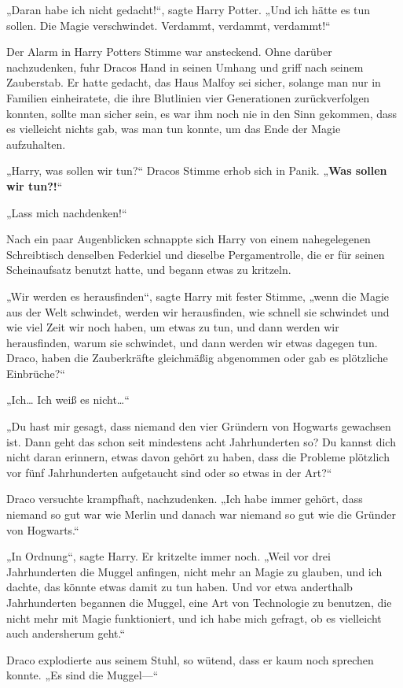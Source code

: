 {„Daran habe ich nicht gedacht!“, sagte Harry Potter. „Und ich hätte es tun sollen. Die Magie verschwindet. Verdammt, verdammt, verdammt!“

Der Alarm in Harry Potters Stimme war ansteckend. Ohne darüber nachzudenken, fuhr Dracos Hand in seinen Umhang und griff nach seinem Zauberstab. Er hatte gedacht, das Haus Malfoy sei sicher, solange man nur in Familien einheiratete, die ihre Blutlinien vier Generationen zurückverfolgen konnten, sollte man sicher sein, es war ihm noch nie in den Sinn gekommen, dass es vielleicht nichts gab, was man tun konnte, um das Ende der Magie aufzuhalten.

„Harry, was sollen wir tun?“ Dracos Stimme erhob sich in Panik. „\textbf{Was sollen wir tun?!}“

„Lass mich nachdenken!“

Nach ein paar Augenblicken schnappte sich Harry von einem nahegelegenen Schreibtisch denselben Federkiel und dieselbe Pergamentrolle, die er für seinen Scheinaufsatz benutzt hatte, und begann etwas zu kritzeln.

„Wir werden es herausfinden“, sagte Harry mit fester Stimme, „wenn die Magie aus der Welt schwindet, werden wir herausfinden, wie schnell sie schwindet und wie viel Zeit wir noch haben, um etwas zu tun, und dann werden wir herausfinden, warum sie schwindet, und dann werden wir etwas dagegen tun. Draco, haben die Zauberkräfte gleichmäßig abgenommen oder gab es plötzliche Einbrüche?“

„Ich… Ich weiß es nicht…“

„Du hast mir gesagt, dass niemand den vier Gründern von Hogwarts gewachsen ist. Dann geht das schon seit mindestens acht Jahrhunderten so? Du kannst dich nicht daran erinnern, etwas davon gehört zu haben, dass die Probleme plötzlich vor fünf Jahrhunderten aufgetaucht sind oder so etwas in der Art?“

Draco versuchte krampfhaft, nachzudenken. „Ich habe immer gehört, dass niemand so gut war wie Merlin und danach war niemand so gut wie die Gründer von Hogwarts.“

„In Ordnung“, sagte Harry. Er kritzelte immer noch. „Weil vor drei Jahrhunderten die Muggel anfingen, nicht mehr an Magie zu glauben, und ich dachte, das könnte etwas damit zu tun haben. Und vor etwa anderthalb Jahrhunderten begannen die Muggel, eine Art von Technologie zu benutzen, die nicht mehr mit Magie funktioniert, und ich habe mich gefragt, ob es vielleicht auch andersherum geht.“

Draco explodierte aus seinem Stuhl, so wütend, dass er kaum noch sprechen konnte. „Es sind die Muggel—“

}
